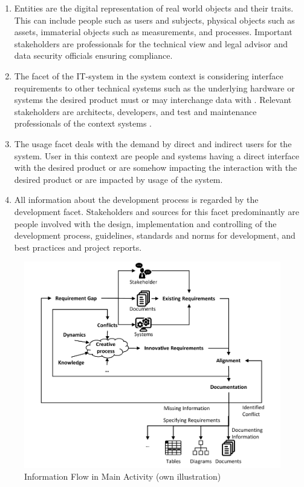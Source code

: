 \begin{enumerate}
    \item Entities are the digital representation of real world objects and their traits. This can include people such as users and subjects, physical objects such as assets, immaterial objects such as measurements, and processes. Important stakeholders are  professionals for the technical view and legal advisor and data security officials ensuring compliance. \parencite[cf.][70-71]{Pohl.2007}
    \item The facet of the IT-system in the system context is considering interface requirements to other technical systems such as the underlying hardware or systems the desired product must or may interchange data with \parencite[cf.][192]{Kotonya.2000}. Relevant stakeholders are architects, developers, and test and maintenance professionals of the context systems \parencite[cf.][72]{Pohl.2007}.
    \item The usage facet deals with the demand by direct and indirect users for the system. User in this context are people and systems having a direct interface with the desired product or are somehow impacting the interaction with the desired product or are impacted by usage of the system. \parencite[cf.][75-77]{Pohl.2007}
    \item All information about the development process is regarded by the development facet. Stakeholders and sources for this facet predominantly are people involved with the design, implementation and controlling of the development process, guidelines, standards and norms for development, and best practices and project reports. \parencite[cf.][79]{Pohl.2007}
\end{enumerate}
\label{endFacet}
\begin{figure}[H]
    \centering
    \includegraphics[scale=1]{img/MainActivity.pdf}
    \caption[Information Flow in Main Activity of Requirements Engineering]{Information Flow in Main Activity  (own illustration)}
    \label{fig:infFlow}
\end{figure}
